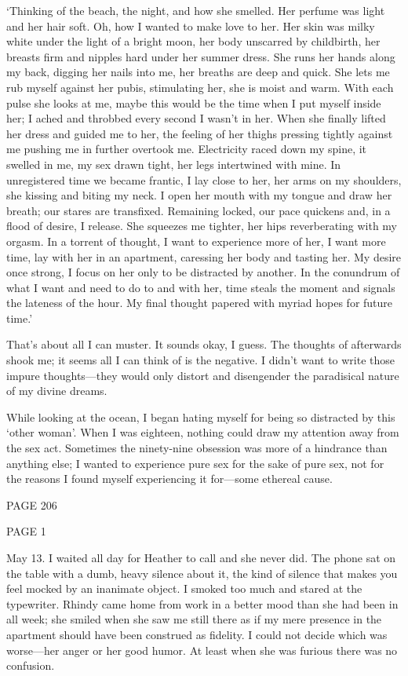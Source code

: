 `Thinking of the beach, the night, and how she smelled. Her perfume was
light and her hair soft. Oh, how I wanted to make love to her. Her skin
was milky white under the light of a bright moon, her body unscarred by
childbirth, her breasts firm and nipples hard under her summer dress.
She runs her hands along my back, digging her nails into me, her breaths
are deep and quick. She lets me rub myself against her pubis,
stimulating her, she is moist and warm. With each pulse she looks at me,
maybe this would be the time when I put myself inside her; I ached and
throbbed every second I wasn't in her. When she finally lifted her dress
and guided me to her, the feeling of her thighs pressing tightly against
me pushing me in further overtook me. Electricity raced down my spine,
it swelled in me, my sex drawn tight, her legs intertwined with mine. In
unregistered time we became frantic, I lay close to her, her arms on my
shoulders, she kissing and biting my neck. I open her mouth with my
tongue and draw her breath; our stares are transfixed. Remaining locked,
our pace quickens and, in a flood of desire, I release. She squeezes me
tighter, her hips reverberating with my orgasm. In a torrent of thought,
I want to experience more of her, I want more time, lay with her in an
apartment, caressing her body and tasting her. My desire once strong, I
focus on her only to be distracted by another. In the conundrum of what
I want and need to do to and with her, time steals the moment and
signals the lateness of the hour. My final thought papered with myriad
hopes for future time.'

That's about all I can muster. It sounds okay, I guess. The thoughts of
afterwards shook me; it seems all I can think of is the negative. I
didn't want to write those impure thoughts---they would only distort and
disengender the paradisical nature of my divine dreams.

While looking at the ocean, I began hating myself for being so
distracted by this `other woman'. When I was eighteen, nothing could
draw my attention away from the sex act. Sometimes the ninety-nine
obsession was more of a hindrance than anything else; I wanted to
experience pure sex for the sake of pure sex, not for the reasons I
found myself experiencing it for---some ethereal cause.

PAGE 206

PAGE 1

May 13. I waited all day for Heather to call and she never did. The
phone sat on the table with a dumb, heavy silence about it, the kind of
silence that makes you feel mocked by an inanimate object. I smoked too
much and stared at the typewriter. Rhindy came home from work in a
better mood than she had been in all week; she smiled when she saw me
still there as if my mere presence in the apartment should have been
construed as fidelity. I could not decide which was worse---her anger or
her good humor. At least when she was furious there was no confusion.

